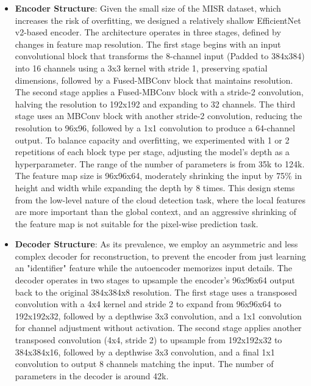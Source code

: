 \documentclass[10pt,letterpaper]{article}
\begin{document}
\begin{itemize}
    \item \textbf{Encoder Structure}: Given the small size of the MISR dataset, which increases the risk of overfitting, we designed a relatively shallow EfficientNet v2-based encoder. The architecture operates in three stages, defined by changes in feature map resolution. The first stage begins with an input convolutional block that transforms the 8-channel input (Padded to 384x384) into 16 channels using a 3x3 kernel with stride 1, preserving spatial dimensions, followed by a Fused-MBConv block that maintains resolution. The second stage applies a Fused-MBConv block with a stride-2 convolution, halving the resolution to 192x192 and expanding to 32 channels. The third stage uses an MBConv block with another stride-2 convolution, reducing the resolution to 96x96, followed by a 1x1 convolution to produce a 64-channel output. To balance capacity and overfitting, we experimented with 1 or 2 repetitions of each block type per stage, adjusting the model's depth as a hyperparameter. The range of the number of parameters is from 35k to 124k. The feature map size is 96x96x64, moderately shrinking the input by 75\% in height and width while expanding the depth by 8 times. This design stems from the low-level nature of the cloud detection task, where the local features are more important than the global context, and an aggressive shrinking of the feature map is not suitable for the pixel-wise prediction task.

    \item \textbf{Decoder Structure}: As its prevalence, we employ an asymmetric and less complex decoder for reconstruction, to prevent the encoder from just learning an "identifier" feature while the autoencoder memorizes input details. The decoder operates in two stages to upsample the encoder's 96x96x64 output back to the original 384x384x8 resolution. The first stage uses a transposed convolution with a 4x4 kernel and stride 2 to expand from 96x96x64 to 192x192x32, followed by a depthwise 3x3 convolution, and a 1x1 convolution for channel adjustment without activation. The second stage applies another transposed convolution (4x4, stride 2) to upsample from 192x192x32 to 384x384x16, followed by a depthwise 3x3 convolution, and a final 1x1 convolution to output 8 channels matching the input. The number of parameters in the decoder is around 42k.
\end{itemize}
\end{document}
